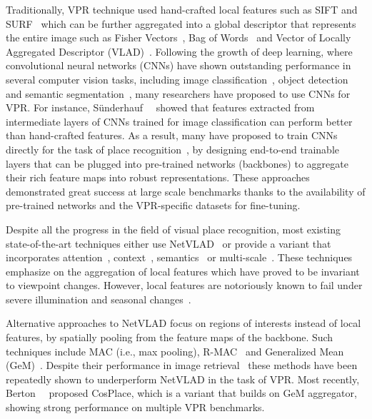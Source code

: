 \documentclass[10pt,twocolumn,letterpaper]{article}
\begin{document}
Traditionally, VPR technique used hand-crafted local features such as SIFT \cite{lowe2004distinctive} and SURF~\cite{bay2006surf} which can be further aggregated into a global descriptor that represents the entire image such as Fisher Vectors~\cite{jegou2010aggregating, perronnin2010large}, Bag of Words~\cite{philbin2007object, torii2013visual, galvez2012bags} and Vector of Locally Aggregated Descriptor (VLAD)~\cite{jegou2011aggregating,arandjelovic2013all}. Following the growth of deep learning, where convolutional neural networks (CNNs) have shown outstanding performance in several computer vision tasks, including image classification~\cite{he2016deep}, object detection~\cite{liu2020deep} and semantic segmentation~\cite{lateef2019survey}, many researchers have proposed to use CNNs for VPR. For instance,  S{\"u}nderhauf~\etal~\cite{sunderhauf2015performance} showed that 
features extracted from intermediate layers of CNNs trained for image classification can perform better than hand-crafted features. As a result, many have proposed to train CNNs directly for the task of place recognition~\cite{arandjelovic2016netvlad, seymour2019semantically, kim2017learned, liu2019stochastic, ge2020self}, by designing end-to-end trainable layers that can be plugged into pre-trained networks (backbones) to aggregate their rich feature maps into robust representations. These approaches demonstrated great success at large scale benchmarks \cite{torii2013visual, warburg2020mapillary} thanks to the availability of pre-trained networks and the VPR-specific datasets for fine-tuning.

Despite all the progress in the field of visual place recognition, most existing state-of-the-art  techniques either use NetVLAD~\cite{arandjelovic2016netvlad, warburg2020mapillary, hausler2021patch, yu2019spatial} or provide a variant that incorporates attention~\cite{zhang2021vector}, context~\cite{kim2017learned}, semantics~\cite{peng2021semantic} or multi-scale~\cite{hausler2021patch}. These techniques emphasize on the aggregation of local features which have proved to be invariant to viewpoint changes. However, local features are notoriously known to fail under severe illumination and seasonal changes~\cite{masone2021survey}.

Alternative approaches to NetVLAD focus on regions of interests instead of local features, by spatially pooling from the feature maps of the backbone. Such techniques include MAC (i.e., max pooling), R-MAC~\cite{tolias2015particular} and Generalized Mean (GeM)~\cite{radenovic2018fine}. Despite their performance in image retrieval~\cite{chen2021deep} these methods have been repeatedly shown to underperform NetVLAD in the task of VPR. Most recently, Berton~\etal~\cite{berton2022rethinking} proposed CosPlace, which is a variant that builds on GeM aggregator, showing strong performance on multiple VPR benchmarks.
\end{document}
